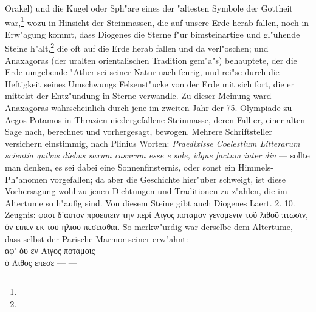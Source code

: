 \documentclass[a4paper, 11pt, oneside, polutonikogreek, german]{article}
\begin{document}
Orakel) und die Kugel oder Sph"are eines der "altesten Symbole der Gottheit war,\footnote{} wozu in Hinsicht der Steinmassen, die auf unsere Erde herab fallen, noch in Erw"agung kommt, dass Diogenes die Sterne f"ur bimsteinartige und gl"uhende Steine h"alt,\footnote{} die oft auf die Erde herab fallen und da verl"oschen; und Anaxagoras (der uralten orientalischen Tradition gem"a"s) behauptete, der die Erde umgebende "Ather sei seiner Natur nach feurig, und rei"se durch die Heftigkeit seines Umschwungs Felsenst"ucke von der Erde mit sich fort, die er mittelst der Entz"undung in Sterne verwandle. Zu dieser Meinung ward Anaxagoras wahrscheinlich durch jene im zweiten Jahr der 75. Olympiade zu Aegos Potamos in Thrazien niedergefallene Steinmasse, deren Fall er, einer alten Sage nach, berechnet und vorhergesagt, bewogen. Mehrere Schriftsteller versichern einstimmig, nach Plinius Worten: \emph{Praedixisse Coelestium Litterarum scientia quibus diebus saxum casurum esse e sole, idque factum inter diu} --- sollte man denken, es sei dabei eine Sonnenfinsternis, oder sonst ein Himmels-Ph"anomen vorgefallen; da aber die Geschichte hier"uber schweigt, ist diese Vorhersagung wohl zu jenen Dichtungen und Traditionen zu z"ahlen, die im Altertume so h"aufig sind. Von diesem Steine gibt auch Diogenes Laert. 2. 10. Zeugnis: φασι δ'αυτον προειπειν την περἰ Αιγος ποταμον γενομενιν τοῦ λιθοῦ πτωσιν, ὀν ειπεν εκ του ηλιου πεσεισθαι. So merkw"urdig war derselbe dem Altertume, dass selbst der Parische Marmor seiner erw"ahnt:
\vspace{1pt}
\\
αφ' ὁυ εν Αιγος ποταμοις\\
ὁ Λιθος επεσε --- ---\\
\vspace{1pt}
\end{document}
